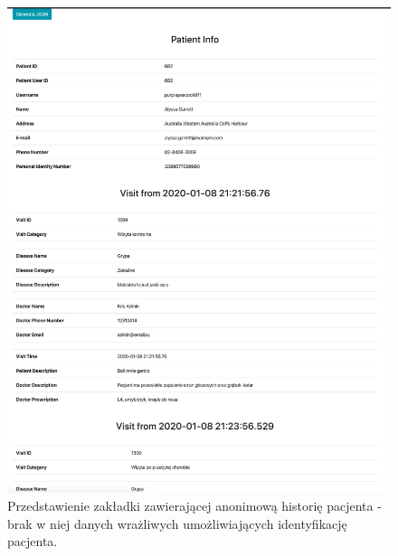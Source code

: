 \begin{figure}[H]
\centering
\label{history_pic}
\includegraphics[width=15cm]{pictures/service/09-history_normal}
\caption{Przedstawienie zakładki zawierającej anonimową historię pacjenta - brak w niej danych wrażliwych umożliwiających identyfikację pacjenta.}
\end{figure}

